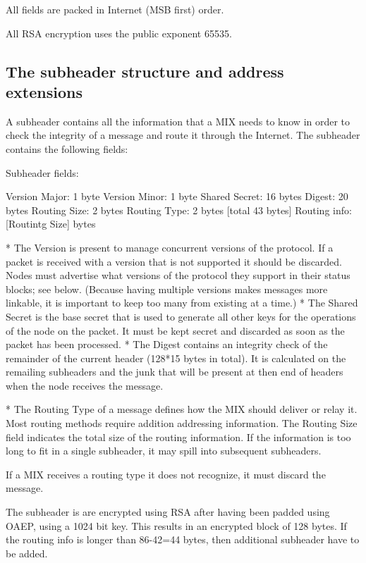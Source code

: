 All fields are packed in Internet (MSB first) order.

All RSA encryption uses the public exponent 65535.

\subsection{The subheader structure and address extensions}

A subheader contains all the information that a MIX needs to know
in order to check the integrity of a message and route it through the
Internet. The subheader contains the following fields: 

Subheader fields:

Version Major:   1 byte
Version Minor:   1 byte
Shared Secret:   16 bytes
Digest:          20 bytes
Routing Size:    2 bytes
Routing Type:    2 bytes  [total 43 bytes]
Routing info:    [Routintg Size] bytes

* The Version is present to manage concurrent versions of the
protocol. If a packet is received with a version that is not supported
it should be discarded. Nodes must advertise what versions of the
protocol they support in their status blocks; see below.
(Because having multiple versions makes messages more linkable, it is
important to keep too many from existing at a time.)
* The Shared Secret is the base secret that is used to generate all
other keys for the operations of the node on the packet. It must be
kept secret and discarded as soon as the packet has been processed. 
* The Digest contains an integrity check of the remainder of the
current header (128*15 bytes in total).  It is calculated on the
remailing subheaders and the junk that will be present at then end 
of headers when the node receives the message. 

* The Routing Type of a message defines how the MIX should deliver or
  relay it.  Most routing methods require addition addressing information.
  The Routing Size field indicates the total size of the routing
  information.   If the information is too long to fit in a single
  subheader, it may spill into subsequent subheaders.

  If a MIX receives a routing type it does not recognize, it must
  discard the message. 

  The subheader is are encrypted using RSA after having been padded
  using OAEP, using a 1024 bit key.  This results in an encrypted block
  of 128 bytes.  If the routing info is longer than 86-42=44 bytes, then
  additional subheader have to be added.

